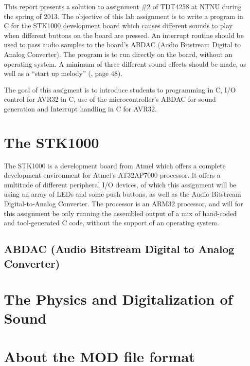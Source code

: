 This report presents a solution to assignment \#2 of TDT4258 at NTNU during the spring of 2013.
The objective of this lab assignment is to write a program in C for the STK1000 development board which causes different sounds to play when different buttons on the board are pressed.
An interrupt routine should be used to pass audio samples to the board's ABDAC (Audio Bitstream Digital to Analog Converter).
The program is to run directly on the board, without an operating system.
A minimum of three different sound effects should be made, as well as a ``start up melody'' (\cite{lab-compendium}, page 48).

The goal of this assigment is to introduce students to programming in C, I/O control for AVR32 in C, use of the microcontroller's ABDAC for sound generation and Interrupt handling in C for AVR32.

\section{The STK1000}
	The STK1000 is a development board from Atmel which offers a complete development environment for Atmel's AT32AP7000 processor.
	It offers a multitude of different peripheral I/O devices, of which this assignment will be using an array of LEDs and some push buttons, as well as the Audio Bitstream Digital-to-Analog Converter.
	The processor is an ARM32 processor, and will for this assignment be only running the assembled output of a mix of hand-coded and tool-generated C code, without the support of an operating system.

	\subsection{ABDAC (Audio Bitstream Digital to Analog Converter)}
		

\section{The Physics and Digitalization of Sound}
	

\section{About the MOD file format}
	
